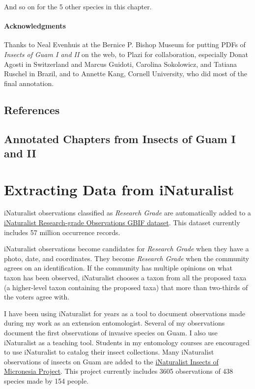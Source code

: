 \documentclass[12pt,letterpaper,english,bibliography=totocnumbered, abstract=on]{scrartcl}
\begin{document}
\medskip
And so on for the 5 other species in this chapter.

\paragraph{Acknowledgments} Thanks to Neal Evenhuis at the Bernice P. Bishop Museum for putting PDFs of \textit{Insects of Guam I and II} on the web, to Plazi for collaboration, especially Donat Agosti in Switzerland and Marcus Guidoti, Carolina Sokolowicz, and Tatiana Ruschel in Brazil, and to Annette Kang, Cornell University, who did most of the final annotation.

\subsection{References}
\printbibliography[heading=none]


\subsection{Annotated Chapters from Insects of Guam I and II}
\newrefsection[blr]
\nocite{*}
\printbibliography[heading=none]



\pagebreak
\section{Extracting Data from iNaturalist}

iNaturalist observations classified as \textit{Research Grade} are automatically added to a \href{https://www.gbif.org/dataset/50c9509d-22c7-4a22-a47d-8c48425ef4a7}{iNaturalist Research-grade Observations GBIF dataset}. This dataset currently includes 57 million occurrence records. 

iNaturalist observations become candidates for \textit{Research Grade} when they have a photo, date, and coordinates. They become \textit{Research Grade} when the community agrees on an identification. If the community has multiple opinions on what taxon has been observed, iNaturalist chooses a taxon from all the proposed taxa (a higher-level taxon containing the proposed taxa) that more than two-thirds of the voters agree with.

I have been using iNaturalist for years as a tool to document observations made during my work as an extension entomologist. Several of my observations document the first observations of invasive species on Guam. I also use iNaturalist as a teaching tool. Students in my entomology courses are encouraged to use iNaturalist to catalog their insect collections. Many iNaturalist observations of insects on Guam are added to the \href{https://www.inaturalist.org/projects/insects-of-micronesia}{iNaturalist Insects of Micronesia Project}. This project currently includes 3605 observations of 438 species made by 154 people. 
\end{document}
